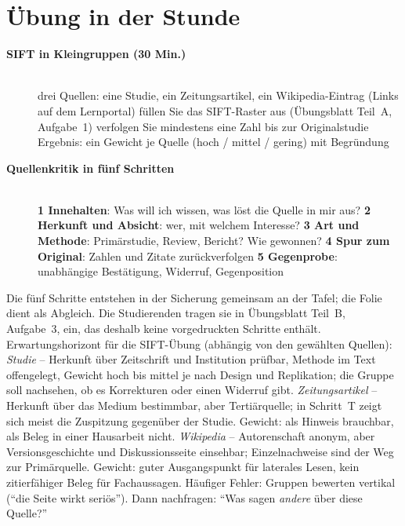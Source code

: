 \section{Übung in der Stunde}
\begin{description}
\item[{\rot\bf SIFT in Kleingruppen (30 Min.)}]~\\[-\lblskip]
\bi
  \ite drei Quellen: eine Studie, ein Zeitungsartikel, ein
    Wikipedia-Eintrag (Links auf dem Lernportal)
  \ite füllen Sie das SIFT-Raster aus (Übungsblatt Teil~A, Aufgabe~1)
  \ite verfolgen Sie mindestens eine Zahl bis zur Originalstudie
  \ite Ergebnis: ein Gewicht je Quelle (hoch / mittel / gering) mit
    Begründung
\ei
\os{\newpage}

\item[{\rot\bf Quellenkritik in fünf Schritten}]~\\[-\lblskip]
\bi
  \ite \textbf{1 Innehalten}: Was will ich wissen, was löst die Quelle in
    mir aus?
  \ite \textbf{2 Herkunft und Absicht}: wer, mit welchem Interesse?
  \ite \textbf{3 Art und Methode}: Primärstudie, Review, Bericht? Wie
    gewonnen?
  \ite \textbf{4 Spur zum Original}: Zahlen und Zitate zurückverfolgen
  \ite \textbf{5 Gegenprobe}: unabhängige Bestätigung, Widerruf,
    Gegenposition
\ei
\os{\newpage}
\end{description}

\begin{lehrhinweis}
Die fünf Schritte entstehen in der Sicherung gemeinsam an der Tafel; die
Folie dient als Abgleich. Die Studierenden tragen sie in Übungsblatt
Teil~B, Aufgabe~3, ein, das deshalb keine vorgedruckten Schritte enthält.
Erwartungshorizont für die SIFT-Übung (abhängig von den gewählten
Quellen): \emph{Studie} -- Herkunft über Zeitschrift
und Institution prüfbar, Methode im Text offengelegt, Gewicht hoch bis
mittel je nach Design und Replikation; die Gruppe soll nachsehen, ob es
Korrekturen oder einen Widerruf gibt. \emph{Zeitungsartikel} -- Herkunft
über das Medium bestimmbar, aber Tertiärquelle; in Schritt~T zeigt sich
meist die Zuspitzung gegenüber der Studie. Gewicht: als Hinweis brauchbar,
als Beleg in einer Hausarbeit nicht. \emph{Wikipedia} -- Autorenschaft
anonym, aber Versionsgeschichte und Diskussionsseite einsehbar;
Einzelnachweise sind der Weg zur Primärquelle. Gewicht: guter
Ausgangspunkt für laterales Lesen, kein zitierfähiger Beleg für
Fachaussagen. Häufiger Fehler: Gruppen bewerten vertikal (\enquote{die
Seite wirkt seriös}). Dann nachfragen: \enquote{Was sagen \emph{andere}
über diese Quelle?}
\end{lehrhinweis}

